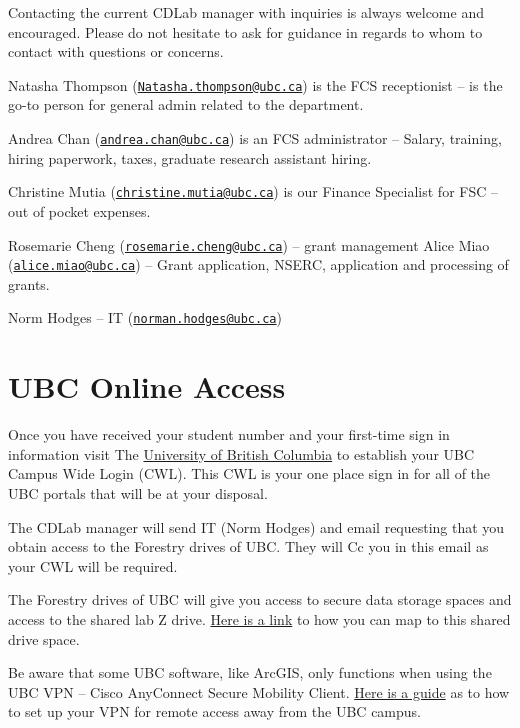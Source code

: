\documentclass[
]{book}
\begin{document}
Contacting the current CDLab manager with inquiries is always welcome and encouraged. Please do not hesitate to ask for guidance in regards to whom to contact with questions or concerns.

Natasha Thompson (\href{mailto:Natasha.thompson@ubc.ca}{\nolinkurl{Natasha.thompson@ubc.ca}}) is the FCS receptionist -- is the go-to person for general admin related to the department.

Andrea Chan (\href{mailto:andrea.chan@ubc.ca}{\nolinkurl{andrea.chan@ubc.ca}}) is an FCS administrator -- Salary, training, hiring paperwork, taxes, graduate research assistant hiring.

Christine Mutia (\href{mailto:christine.mutia@ubc.ca}{\nolinkurl{christine.mutia@ubc.ca}}) is our Finance Specialist for FSC -- out of pocket expenses.

Rosemarie Cheng (\href{mailto:rosemarie.cheng@ubc.ca}{\nolinkurl{rosemarie.cheng@ubc.ca}}) -- grant management Alice Miao (\href{mailto:alice.miao@ubc.ca}{\nolinkurl{alice.miao@ubc.ca}}) -- Grant application, NSERC, application and processing of grants.

Norm Hodges -- IT (\href{mailto:norman.hodges@ubc.ca}{\nolinkurl{norman.hodges@ubc.ca}})

\hypertarget{ubconlineaccess}{%
\chapter*{UBC Online Access}\label{ubconlineaccess}}

Once you have received your student number and your first-time sign in information visit The \href{https://activate.id.ubc.ca/iamweb/}{University of British Columbia} to establish your UBC Campus Wide Login (CWL). This CWL is your one place sign in for all of the UBC portals that will be at your disposal.

The CDLab manager will send IT (Norm Hodges) and email requesting that you obtain access to the Forestry drives of UBC. They will Cc you in this email as your CWL will be required.

The Forestry drives of UBC will give you access to secure data storage spaces and access to the shared lab Z drive. \href{https://it.ubc.ca/services/web-servers-storage/home-drive-storage-service/mapping-or-mounting-your-home-drive-0}{Here is a link} to how you can map to this shared drive space.

Be aware that some UBC software, like ArcGIS, only functions when using the UBC VPN -- Cisco AnyConnect Secure Mobility Client. \href{https://it.ubc.ca/services/email-voice-internet/myvpn/setup-documents}{Here is a guide} as to how to set up your VPN for remote access away from the UBC campus.
\end{document}
